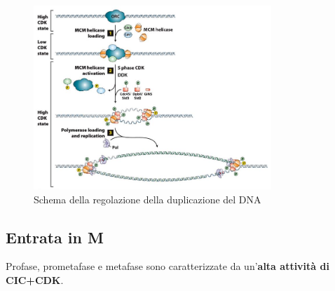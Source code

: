             \begin{figure}[h]
                \centering
                \includegraphics[width=0.8\textwidth]{images/regolazione_duplicazione.JPG}
                \caption{\small Schema della regolazione della duplicazione del DNA}
                \label{fig:mesh1}
            \end{figure}
        
    \subsection{Entrata in M}
        Profase, prometafase e metafase sono caratterizzate da un'\textbf{alta attività di CIC+CDK}.
        
